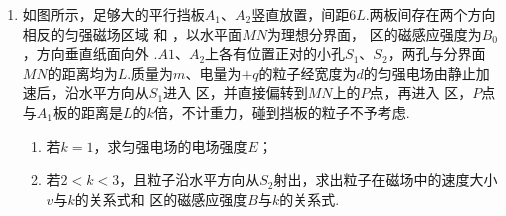\begin{enumerate}[leftmargin=0em]
{\begin{enumerate}
\end{enumerate}
}

\newpage
\item
{}
如图所示，足够大的平行挡板$ A_{1} $、$ A_{2} $竖直放置，间距$ 6L $.两板间存在两个方向相反的匀强磁场区域  和  ，以水平面$ MN $为理想分界面，  区的磁感应强度为$ B_{0} $，方向垂直纸面向外 $. A1 $、$ A_{2} $上各有位置正对的小孔$ S_{1} $、$ S_{2} $，两孔与分界面$ MN $的距离均为$ L $.质量为$ m $、电量为$ +q $的粒子经宽度为$ d $的匀强电场由静止加速后，沿水平方向从$ S_{1} $进入  区，并直接偏转到$ MN $上的$ P $点，再进入  区，$ P $点与$ A_{1} $板的距离是$ L $的$ k $倍，不计重力，碰到挡板的粒子不予考虑.
\begin{enumerate}
\renewcommand{\labelenumii}{(\arabic{enumii})}

\item 
若$ k=1 $，求匀强电场的电场强度$ E $；

\item 
若$ 2<k<3 $，且粒子沿水平方向从$ S_{2} $射出，求出粒子在磁场中的速度大小$ v $与$ k $的关系式和  区的磁感应强度$ B $与$ k $的关系式.




\end{enumerate}
\begin{figure}[h!]
\flushright

\end{figure}




\end{enumerate}
